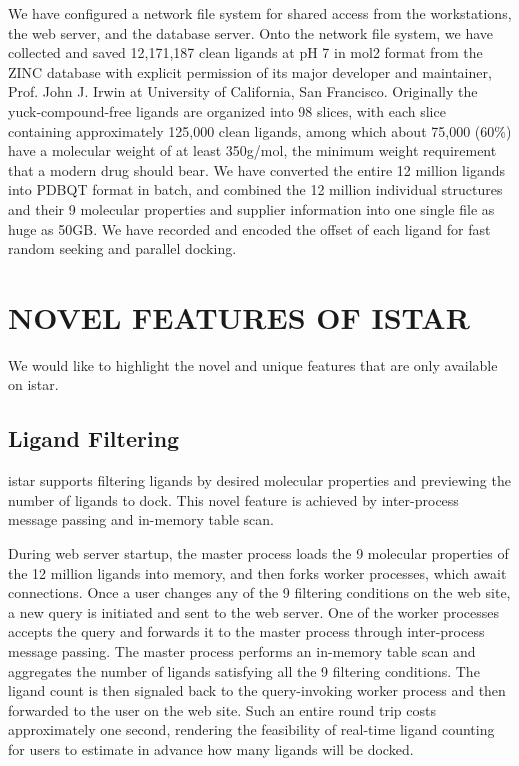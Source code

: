 \documentclass[12pt]{article}
\begin{document}
We have configured a network file system for shared access from the workstations, the web server, and the database server. Onto the network file system, we have collected and saved 12,171,187 clean ligands at pH 7 in mol2 format from the ZINC database \citep{532,1178} with explicit permission of its major developer and maintainer, Prof. John J. Irwin at University of California, San Francisco. Originally the yuck-compound-free ligands are organized into 98 slices, with each slice containing approximately 125,000 clean ligands, among which about 75,000 (60\%) have a molecular weight of at least 350g/mol, the minimum weight requirement that a modern drug should bear. We have converted the entire 12 million ligands into PDBQT format in batch, and combined the 12 million individual structures and their 9 molecular properties and supplier information into one single file as huge as 50GB. We have recorded and encoded the offset of each ligand for fast random seeking and parallel docking.

\section*{\sffamily \Large NOVEL FEATURES OF ISTAR}

We would like to highlight the novel and unique features that are only available on istar.

\subsection*{\sffamily \large Ligand Filtering}

istar supports filtering ligands by desired molecular properties and previewing the number of ligands to dock. This novel feature is achieved by inter-process message passing and in-memory table scan.

During web server startup, the master process loads the 9 molecular properties of the 12 million ligands into memory, and then forks worker processes, which await connections. Once a user changes any of the 9 filtering conditions on the web site, a new query is initiated and sent to the web server. One of the worker processes accepts the query and forwards it to the master process through inter-process message passing. The master process performs an in-memory table scan and aggregates the number of ligands satisfying all the 9 filtering conditions. The ligand count is then signaled back to the query-invoking worker process and then forwarded to the user on the web site. Such an entire round trip costs approximately one second, rendering the feasibility of real-time ligand counting for users to estimate in advance how many ligands will be docked.
\end{document}
